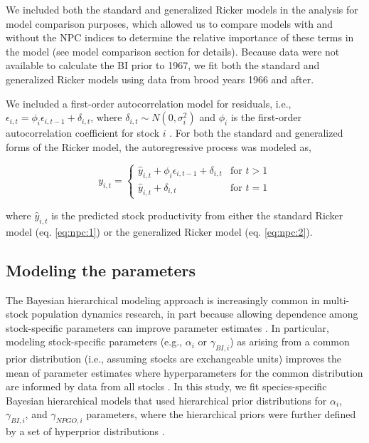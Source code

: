 We included both the standard and generalized Ricker models in the analysis for
model comparison purposes, which allowed us to compare models with and without
the NPC indices to determine the relative importance of these terms in the model
(see model comparison section for details). Because data were not available to
calculate the BI prior to 1967, we fit both the standard and generalized Ricker
models using data from brood years 1966 and after.

We included a first-order autocorrelation model for residuals, i.e.,
\(\epsilon_{i,t} = \phi_i \epsilon_{i,t-1} + \delta_{i,t}\), where
\(\delta_{i,t} \sim N(0,\sigma_i^2)\) and \(\phi_i\) is the first-order
autocorrelation coefficient for stock \(i\) \citep{Mueter2002a, Chatfield2004}.
For both the standard and generalized forms of the Ricker model, the
autoregressive process was modeled as,

\begin{equation}
y_{i,t} = \left\{
    \begin{array}{ll}
    \hat{y}_{i,t} + \phi_i \epsilon_{i,t-1} + \delta_{i,t} & \text{for } t>1 \\
    \hat{y}_{i,t} + \delta_{i,t} & \text{for } t=1
    \end{array}
  \right.
\label{eq:npc:3}
\end{equation}

\noindent where \(\hat{y}_{i,t}\) is the predicted stock productivity from
either the standard Ricker model (eq. \ref{eq:npc:1}) or the generalized Ricker
model (eq. \ref{eq:npc:2}).


\subsection{Modeling the parameters}

The Bayesian hierarchical modeling approach is increasingly common in
multi-stock population dynamics research, in part because allowing dependence
among stock-specific parameters can improve parameter estimates
\citep{Gelman2004a, Thorson2015b}. In particular, modeling stock-specific
parameters (e.g., \(\alpha_i\) or \(\gamma_{BI,i}\)) as arising from a common
prior distribution (i.e., assuming stocks are exchangeable units) improves the
mean of parameter estimates where hyperparameters for the common distribution
are informed by data from all stocks \citep{Gauch2006}. In this study, we fit
species-specific Bayesian hierarchical models that used hierarchical prior
distributions for \(\alpha_i\), \(\gamma_{BI,i}\), and \(\gamma_{NPGO,i}\)
parameters, where the hierarchical priors were further defined by a set of
hyperprior distributions \citep{Gelman2004a}.

